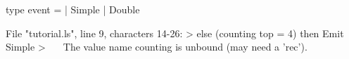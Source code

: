 \runverbatimfalse
{}
\begin{RunVerbatimMsg}
type event   =  | Simple  | Double
\end{RunVerbatimMsg}
\begin{RunVerbatimErr}
File "tutorial.ls", line 9, characters 14-26:
>        else (counting top = 4) then Emit Simple
>              ^^^^^^^^^^^^
The value name counting is unbound (may need a 'rec').
\end{RunVerbatimErr}
